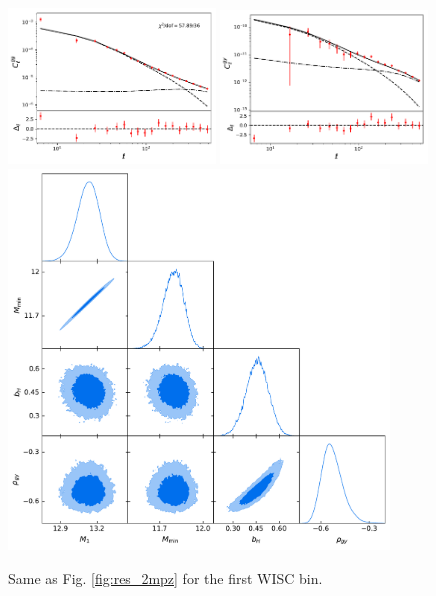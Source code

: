 \documentclass{article}
\begin{document}
  \begin{figure}
    \centering
    \includegraphics[width = 0.49\textwidth]{../output_test/sampler_minimal_hmc_wisc1_cls_wisc1_wisc1}
    \includegraphics[width = 0.49\textwidth]{../output_test/sampler_minimal_hmc_wisc1_cls_wisc1_y_milca}
    \includegraphics[width = 0.90\textwidth]{../output_test/sampler_minimal_hmc_wisc1_triangle}
    \caption{Same as Fig. \ref{fig:res_2mpz} for the first WISC bin.}\label{fig:res_wisc1}
  \end{figure}
\end{document}
